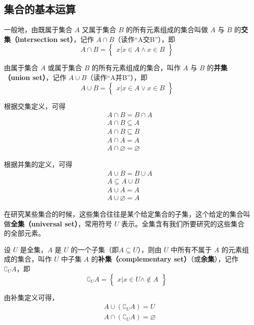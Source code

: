 \subsection{集合的基本运算}
一般地，由既属于集合 $A$ 又属于集合 $B$ 的所有元素组成的集合叫做 $A$ 与 $B$ 的\textbf{交集（intersection set）}，记作 $A \cap B$（读作“A交B”），即
\begin{equation}
A\cap B = \begin{Bmatrix} x|x\in A \wedge x\in B \end{Bmatrix}
\end{equation}

由属于集合 $A$ 或属于集合 $B$ 的所有元素组成的集合，叫作 $A$ 与 $B$ 的\textbf{并集（union set）}，记作 $A\cup B$（读作“A并B”），即
\begin{equation}
A\cup B = \begin{Bmatrix}x|x\in A \vee x\in B\end{Bmatrix}
\end{equation}

根据交集定义，可得
\begin{equation}
\begin{aligned}
&A\cap B = B\cap A \\ 
&A\cap B \subseteq A \\
&A\cap B \subseteq B \\
&A\cap A = A \\
&A\cap \varnothing = \varnothing
\end{aligned}
\end{equation}

根据并集的定义，可得
\begin{equation}
\begin{aligned}
&A\cup B = B\cup A \\
&A\subseteq A\cup B \\
&A\cup A = A \\
&A\cup \varnothing = A
\end{aligned}
\end{equation}

在研究某些集合的时候，这些集合往往是某个给定集合的子集，这个给定的集合叫做\textbf{全集（universal set）}，常用符号 $U$ 表示。全集含有我们所要研究的这些集合的全部元素。

设 $U$ 是全集，$A$ 是 $U$ 的一个子集（即$A\subseteq U$），则由 $U$ 中所有不属于 $A$ 的元素组成的集合，叫作 $U$ 中子集 $A$ 的\textbf{补集（complementary set）}（或\textbf{余集}），记作$\complement_UA$，即
\begin{equation}
\complement_UA = \begin{Bmatrix}x|x\in U \wedge \notin A\end{Bmatrix}
\end{equation}

由补集定义可得，
\begin{equation}
\begin{aligned}
&A\cup (\complement_UA) = U \\
&A\cap (\complement_UA) = \varnothing
\end{aligned}
\end{equation}
